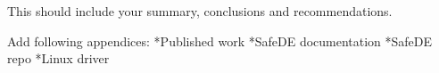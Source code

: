 \documentclass[a4paper,12pt]{article}
\begin{document}
{This should include your summary, conclusions and recommendations. }

\newpage

\medskip



\clearpage
\newpage

\begin{appendices}

{Add following appendices: 
*Published work
*SafeDE documentation
*SafeDE repo
*Linux driver
}

\end{appendices}
\end{document}
